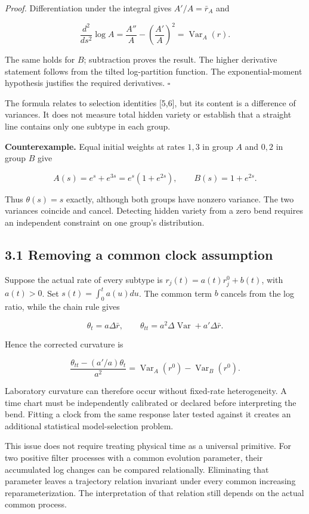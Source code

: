 \documentclass[
  11pt,
  a4paper,
]{article}
\begin{document}
\emph{Proof.} Differentiation under the integral gives \(A'/A=\bar r_A\) and

\[\frac{d^2}{ds^2}\log A=\frac{A''}{A}-\left(\frac{A'}A\right)^2
=\operatorname{Var}_A(r).\]

The same holds for \(B\); subtraction proves the result. The higher derivative statement follows from the tilted log-partition function. The exponential-moment hypothesis justifies the required derivatives. \(\square\)

The formula relates to selection identities {[}5,6{]}, but its content is a difference of variances. It does not measure total hidden variety or establish that a straight line contains only one subtype in each group.

\textbf{Counterexample.} Equal initial weights at rates \(1,3\) in group \(A\) and \(0,2\) in group \(B\) give

\[A(s)=e^s+e^{3s}=e^s(1+e^{2s}),\qquad B(s)=1+e^{2s}.\]

Thus \(\theta(s)=s\) exactly, although both groups have nonzero variance. The two variances coincide and cancel. Detecting hidden variety from a zero bend requires an independent constraint on one group's distribution.

\subsection{3.1 Removing a common clock assumption}\label{removing-a-common-clock-assumption}

Suppose the actual rate of every subtype is \(r_j(t)=a(t)r_j^0+b(t)\), with \(a(t)>0\). Set \(s(t)=\int_0^t a(u)du\). The common term \(b\) cancels from the log ratio, while the chain rule gives

\[\theta_t=a\Delta\bar r,\qquad
\theta_{tt}=a^2\Delta\operatorname{Var}+a'\Delta\bar r.\]

Hence the corrected curvature is

\[\frac{\theta_{tt}-(a'/a)\theta_t}{a^2}
=\operatorname{Var}_A(r^0)-\operatorname{Var}_B(r^0).\]

Laboratory curvature can therefore occur without fixed-rate heterogeneity. A time chart must be independently calibrated or declared before interpreting the bend. Fitting a clock from the same response later tested against it creates an additional statistical model-selection problem.

This issue does not require treating physical time as a universal primitive. For two positive filter processes with a common evolution parameter, their accumulated log changes can be compared relationally. Eliminating that parameter leaves a trajectory relation invariant under every common increasing reparameterization. The interpretation of that relation still depends on the actual common process.
\end{document}

